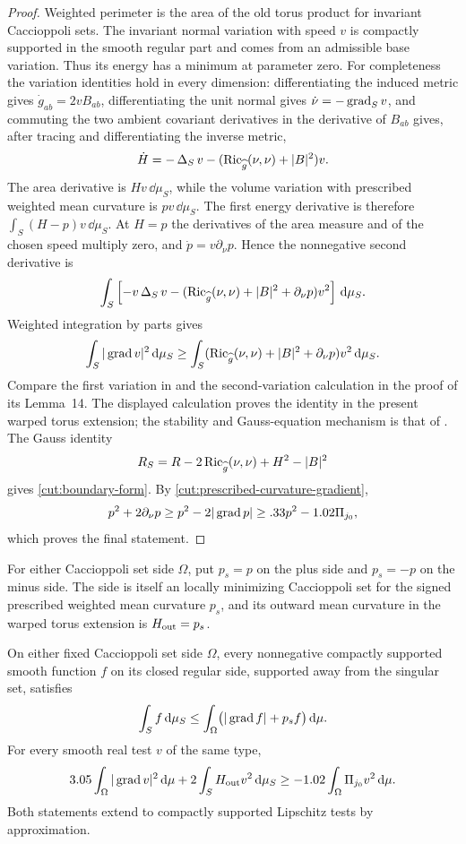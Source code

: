 \begin{proof}
Weighted perimeter is the area of the old torus product for invariant
Caccioppoli sets.  The invariant normal variation with speed $v$ is compactly
supported in the smooth regular part and comes from an admissible base
variation.  Thus its energy has a minimum at parameter zero.
For completeness the variation identities hold in every dimension:
differentiating the induced metric gives $\dot g_{ab}=2vB_{ab}$,
differentiating the unit normal gives $\dot\nu=-\operatorname{grad}_Sv$, and
commuting the two ambient covariant derivatives in the derivative of
$B_{ab}$ gives, after tracing and differentiating the inverse metric,
\[
 \dot H=-\operatorname{\Delta}_S v-(\operatorname{Ric}_{\widehat g}(\nu,\nu)+|B|^2)v.
\]
The area derivative is $Hv\,\dd\mu_S$, while the volume variation with prescribed weighted mean curvature is $pv\,\dd\mu_S$.  The first energy derivative is therefore
$\int_S(H-p)v\,\dd\mu_S$.  At $H=p$ the derivatives of the area
measure and of the chosen speed multiply zero, and
$\dot p=v\partial_\nu p$.  Hence the nonnegative second derivative is
\[
 \int_S\left[-v\operatorname{\Delta}_Sv-
 (\operatorname{Ric}_{\widehat g}(\nu,\nu)+|B|^2+\partial_\nu p)v^2\right]
                         \,\mathrm d\mu_S.
\]
Weighted integration by parts gives
\[
 \int_S|\operatorname{grad} v|^2\,\mathrm d\mu_S
 \ge\int_S(\operatorname{Ric}_{\widehat g}(\nu,\nu)+|B|^2+
                           \partial_\nu p)v^2\,\mathrm d\mu_S.
\]
Compare the first variation in \citet[Lemma~13]{chodoshLi} and the
second-variation calculation in the proof of its Lemma~14. The displayed
calculation proves the identity in the present warped torus extension; the
stability and Gauss-equation mechanism is that of
\citet[Section~1]{schoenYau1979Structure}.
The Gauss identity
\[
 R_S=R-2\operatorname{Ric}_{\widehat g}(\nu,\nu)+H^2-|B|^2
\]
gives \eqref{cut:boundary-form}.  By \eqref{cut:prescribed-curvature-gradient},
\[
 p^2+2\partial_\nu p
       \ge p^2-2|\operatorname{grad} p|
       \ge .33p^2-1.02\Pi_{j_0},
\]
which proves the final statement.
\end{proof}

For either Caccioppoli set side $\Omega$, put $p_s=p$ on the plus side and
$p_s=-p$ on the minus side.  The side is itself an locally minimizing
Caccioppoli set for the signed prescribed weighted mean curvature $p_s$, and its outward mean curvature in the warped torus extension is $H_{\rm out}=p_s$.

\begin{lemma}\label{cut:side-estimate}
On either fixed Caccioppoli set side $\Omega$, every nonnegative compactly
supported smooth function $f$ on its closed regular side, supported
away from the singular set, satisfies
\begin{equation}\label{cut:deletion}
       \int_S f\,\mathrm d\mu_S
       \le\int_\Omega\bigl(|\operatorname{grad} f|+p_sf\bigr)\,\mathrm d\mu.
\end{equation}
For every smooth real test $v$ of the same type,
\begin{equation}\label{cut:side-form}
 3.05\int_\Omega|\operatorname{grad} v|^2\,\mathrm d\mu
       +2\int_S H_{\rm out}v^2\,\mathrm d\mu_S
       \ge-1.02\int_\Omega\Pi_{j_0}v^2\,\mathrm d\mu.
\end{equation}
Both statements extend to compactly supported Lipschitz tests by
approximation.
\end{lemma}

